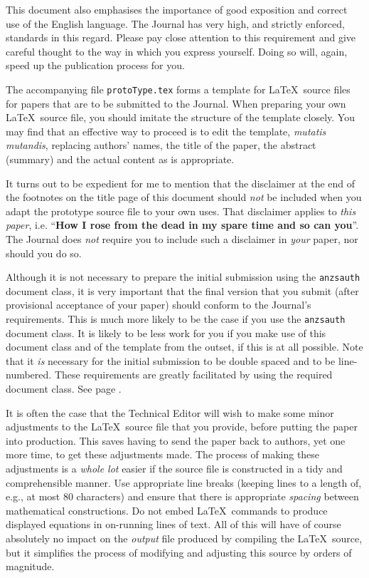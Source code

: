 \documentclass[times, doublespace]{anzsauth}
\begin{document}
This document also emphasises the importance of good exposition and
correct use of the English language.  The Journal has very high,
and strictly enforced, standards in this regard.  Please pay close
attention to this requirement and give careful thought to the way
in which you express yourself.  Doing so will, again, speed up the
publication process for you.

The accompanying file \texttt{protoType.tex} forms a template for
\LaTeX\ source files for papers that are to be submitted to the
Journal.  When preparing your own \LaTeX\ source file, you should
imitate the structure of the template closely.  You may find that
an effective way to proceed is to edit the template, \textit{mutatis
mutandis}, replacing authors' names, the title of the paper,
the abstract (summary) and the actual content as is appropriate.

It turns out to be expedient for me to mention that the disclaimer at
the end of the footnotes on the title page of this document should
\emph{not} be included when you adapt the prototype source file
to your own uses.  That disclaimer applies to \emph{this paper},
i.e. ``\textbf{How I rose from the dead in my spare time and so
can you}''.  The Journal does \emph{not} require you to include
such a disclaimer in \emph{your} paper, nor should you do so.

Although it is not necessary to prepare the initial submission using
the \texttt{anzsauth} document class, it is very important that
the final version that you submit (after provisional acceptance of
your paper) should conform to the Journal's requirements.  This is
much more likely to be the case if you use the \texttt{anzsauth}
document class.  It is likely to be less work for you if you make
use of this document class and of the template from the outset,
if this is at all possible. Note that it \emph{is} necessary for
the initial submission to be double spaced and to be line-numbered.
These requirements are greatly facilitated by using the required
document class.  See page \pageref{pg:dsln}.

It is often the case that the Technical Editor will wish to make
some minor adjustments to the \LaTeX\ source file that you provide,
before putting the paper into production.  This saves having to
send the paper back to authors, yet one more time, to get these
adjustments made.  The process of making these adjustments is
a \emph{whole lot} easier if the source file is constructed in
a tidy and comprehensible manner.  Use appropriate line breaks
(keeping lines to a length of, e.g., at most 80 characters) and
ensure that there is appropriate \emph{spacing} between mathematical
constructions.  Do not embed \LaTeX\ commands to produce displayed
equations in on-running lines of text.  All of this will have of
course absolutely no impact on the \emph{output} file produced
by compiling the \LaTeX\ source, but it simplifies the process of
modifying and adjusting this source by orders of magnitude.
\end{document}
